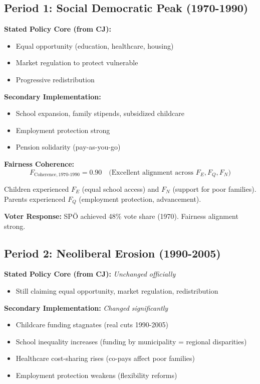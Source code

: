 \subsection{Period 1: Social Democratic Peak (1970-1990)}

\textbf{Stated Policy Core (from CJ):}
\begin{itemize}[nosep]
\item Equal opportunity (education, healthcare, housing)
\item Market regulation to protect vulnerable
\item Progressive redistribution
\end{itemize}

\textbf{Secondary Implementation:}
\begin{itemize}[nosep]
\item School expansion, family stipends, subsidized childcare
\item Employment protection strong
\item Pension solidarity (pay-as-you-go)
\end{itemize}

\textbf{Fairness Coherence:}
\begin{equation}
F_{\text{Coherence}, 1970\text{-}1990} = 0.90 \quad \text{(Excellent alignment across } F_E, F_Q, F_N\text{)}
\end{equation}

Children experienced $F_E$ (equal school access) and $F_N$ (support for poor families).
Parents experienced $F_Q$ (employment protection, advancement).

\textbf{Voter Response:} SPÖ achieved 48\% vote share (1970). Fairness alignment strong.

\subsection{Period 2: Neoliberal Erosion (1990-2005)}

\textbf{Stated Policy Core (from CJ):} \textit{Unchanged officially}
\begin{itemize}[nosep]
\item Still claiming equal opportunity, market regulation, redistribution
\end{itemize}

\textbf{Secondary Implementation:} \textit{Changed significantly}
\begin{itemize}[nosep]
\item Childcare funding stagnates (real cuts 1990-2005)
\item School inequality increases (funding by municipality = regional disparities)
\item Healthcare cost-sharing rises (co-pays affect poor families)
\item Employment protection weakens (flexibility reforms)
\end{itemize}

